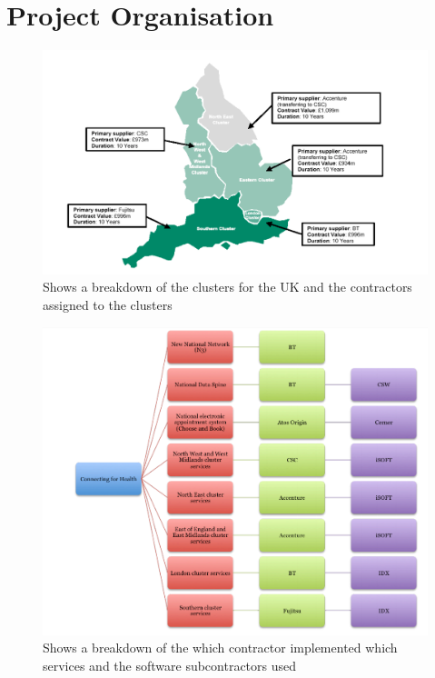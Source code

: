 \documentclass[a4paper,12pt]{scrartcl}
\begin{document}
	\section{Project Organisation}
	{
		\begin{figure}
			\centering
			\includegraphics[width=\textwidth]{NPfITClusterContracts}
			\caption{Shows a breakdown of the clusters for the UK and the contractors assigned to the clusters\cite{Campion-Awwad2014}}
			\label{fig:NPfITClusterContracts}
		\end{figure}
		\begin{figure}
			\centering
			\includegraphics[width=\textwidth]{NPfITContractBreakdown}
			\caption{Shows a breakdown of the which contractor implemented which services and the software subcontractors used\cite{Campion-Awwad2014}}
			\label{fig:NPfITContractBreakdown}
		\end{figure}
}
\end{document}
